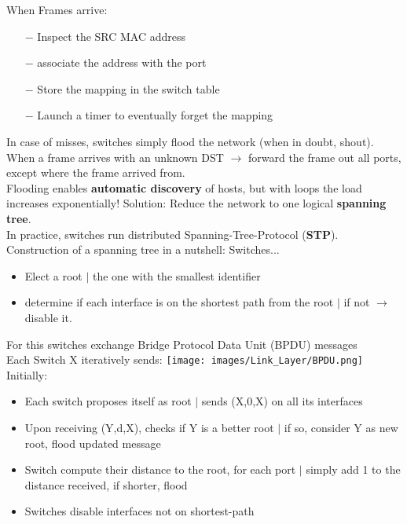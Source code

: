 \documentclass[a4paper, fontsize=8pt, landscape, DIV=1]{scrartcl}
\begin{document}
\begin{multicols*}{4}
		When Frames arrive:
		\vspace{-0.2cm} 
		\begin{itemize}[noitemsep]
			\item [$-$] Inspect the SRC MAC address
			\item [$-$] associate the address with the port
			\item [$-$] Store the mapping in the switch table
			\item [$-$] Launch a timer to eventually forget the mapping
		\end{itemize}
		In case of misses, switches simply flood the network (when in doubt,
		shout).\\
		When a frame arrives with an unknown DST $\rightarrow$ forward the frame
		out all ports, except where the frame arrived from.\\ 
		Flooding enables \textbf{automatic discovery} of hosts, but with loops the
		load increases exponentially! Solution: Reduce the network to one logical
		\textbf{spanning tree}.\\
		In practice, switches run distributed Spanning-Tree-Protocol
		(\textbf{STP}). \\
		Construction of a spanning tree in a nutshell: Switches...
		\begin{itemize}[noitemsep]
			\item Elect a root $\vert$ the one with the smallest identifier
			\item determine if each interface is on the shortest path from the root
			$\vert$ if not $\rightarrow$ disable it.
		\end{itemize}
		For this switches exchange Bridge Protocol Data Unit (BPDU) messages\\
		Each Switch X iteratively sends: 
		\texttt{[image: images/Link\_Layer/BPDU.png]}
		Initially: 
		\vspace{-0.2cm}
		\begin{itemize}[noitemsep]
			\item Each switch proposes itself as root $\vert$ sends (X,0,X) on all its
			interfaces
			\item Upon receiving (Y,d,X), checks if Y is a better root $\vert$ if so,
			consider Y as new root, flood updated message 
			\item Switch compute their distance to the root, for each port $\vert$
			simply add 1 to the distance received, if shorter, flood
			\item Switches disable interfaces not on shortest-path
		\end{itemize}

\end{multicols*}
\end{document}
